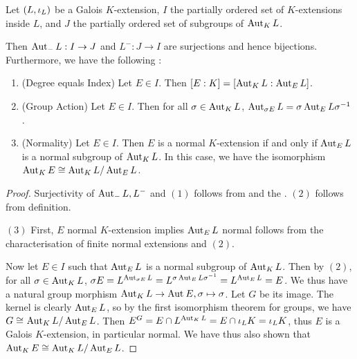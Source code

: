 \documentclass[main.tex]{subfiles}
\begin{document}
\begin{thm}  

  Let $(L,\iota_L)$ be a Galois $K$-extension,
  $I$ the partially ordered set of $K$-extensions inside $L$, 
  and $J$ the partially ordered set of subgroups of $\operatorname{Aut}_{K}{L}$. 

  Then $\operatorname{Aut}_{-}{L} : I \to J$ and $L^{-} : J \to I$ are surjections
  and hence bijections. 
  Furthermore, we have the following : 
  \begin{enumerate}
    \item (Degree equals Index) Let $E \in I$. 
    Then $[E : K] = [\operatorname{Aut}_{K}{L} : \operatorname{Aut}_{E}{L}]$.
    \item (Group Action) Let $E \in I$. 
    Then for all $\sigma \in \operatorname{Aut}_{K}{L}$, 
    $\operatorname{Aut}_{\sigma E}{L} = \sigma \operatorname{Aut}_{E}{L} \sigma^{-1}$. 
    \item (Normality) Let $E \in I$. 
    Then $E$ is a normal $K$-extension if and only if 
    $\operatorname{Aut}_{E}{L}$ is a normal subgroup of $\operatorname{Aut}_{K}{L}$. 
    In this case, we have the isomorphism 
    $\operatorname{Aut}_{K}{E} \cong \operatorname{Aut}_{K}{L} / \operatorname{Aut}_{E}{L}$. 
  \end{enumerate}
\end{thm}
\begin{proof}
  Surjectivity of $\operatorname{Aut}_{-}{L}, L^-$ and $(1)$ follows from 
   and 
  the . 
  $(2)$ follows from definition. 

  $(3)$ First, $E$ normal $K$-extension implies $\operatorname{Aut}_{E}{L}$ normal 
  follows from the 
  {characterisation of finite normal extensions} and $(2)$. 

  Now let $E \in I$ such that 
  $\operatorname{Aut}_{E}{L}$ is a normal subgroup of $\operatorname{Aut}_{K}{L}$.
  Then by $(2)$, for all $\sigma \in \operatorname{Aut}_{K}{L}$, 
  $\sigma E = L^{\operatorname{Aut}_{\sigma E}{L}} = L^{\sigma \operatorname{Aut}_{E}{L} \sigma^{-1}}
  = L^{\operatorname{Aut}_{E}{L}} = E$.
  We thus have a natural group morphism 
  $\operatorname{Aut}_{K}{L} \to \operatorname{Aut}_{}{E}, \sigma \mapsto \sigma$.
  Let $G$ be its image. 
  The kernel is clearly $\operatorname{Aut}_{E}{L}$, 
  so by the first isomorphism theorem for groups, 
  we have $G \cong_{} \operatorname{Aut}_{K}{L} / \operatorname{Aut}_{E}{L}$.
  Then $E^{G} = E \cap L^{\operatorname{Aut}_{K}{L}} = E \cap \iota_L K = \iota_L K$,
  thus $E$ is a Galois $K$-extension, in particular normal. 
  We have thus also shown that $\operatorname{Aut}_{K}{E} \cong \operatorname{Aut}_{K}{L} / \operatorname{Aut}_{E}{L}$. 
\end{proof}
\end{document}
